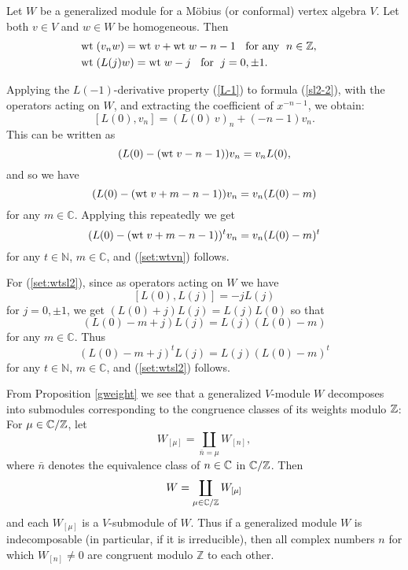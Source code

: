 \documentclass[12pt]{article}
\begin{document}
\begin{propo}\label{gweight}
Let $W$ be a generalized module for a M\"obius (or conformal) vertex
algebra $V$. Let both $v\in V$ and $w\in W$ be homogeneous. Then
\begin{eqnarray}
&\mbox{\rm wt}\;(v_n w)=\mbox{\rm wt}\; v +\mbox{\rm wt}\; w-n-1 \;\; \mbox{ for any }\; n\in {\mathbb Z},
&\label{set:wtvn}\\
&\mbox{\rm wt}\;(L(j)w)=\mbox{\rm wt}\; w-j \;\;\mbox{ for }\; j=0,\pm 1.&\label{set:wtsl2}
\end{eqnarray}
\end{propo}
\pf Applying the $L(-1)$-derivative property (\ref{L-1}) to formula
(\ref{sl2-2}), with the operators acting on $W$, and extracting the
coefficient of $x^{-n-1}$, we obtain:
\begin{equation}\label{[L(0),v_n]}
[L(0), v_n]=(L(0)\,v)_n+(-n-1)v_n.
\end{equation}
This can be written as
\[
(L(0)-(\mbox{\rm wt}\; v-n-1))v_n=v_n L(0),
\]
and so we have
\[
(L(0)-(\mbox{\rm wt}\; v+m-n-1))v_n=v_n (L(0)-m)
\]
for any $m\in {\mathbb C}$. Applying this repeatedly we get
\[
(L(0)-(\mbox{\rm wt}\; v+m-n-1))^t v_n=v_n (L(0)-m)^t
\]
for any $t\in {\mathbb N}$, $m\in {\mathbb C}$, and (\ref{set:wtvn})
follows.

For (\ref{set:wtsl2}), since as operators acting on $W$ we have
\begin{equation}\label{set:0j}
[L(0),L(j)]=-jL(j)
\end{equation}
for $j=0,\pm 1$, we get $(L(0)+j)L(j)=L(j)L(0)$ so that
\[
(L(0)-m+j)L(j)=L(j)(L(0)-m)
\]
for any $m\in {\mathbb C}$. Thus
\[
(L(0)-m+j)^tL(j)=L(j)(L(0)-m)^t
\]
for any $t\in {\mathbb N}$, $m\in {\mathbb C}$, and (\ref{set:wtsl2})
follows. \epf

\begin{rema}\label{congruent}{\rm
{}From Proposition \ref{gweight} we see that a generalized $V$-module
$W$ decomposes into submodules corresponding to the congruence classes
of its weights modulo $\mathbb{Z}$: For $\mu \in \mathbb{C}/\mathbb{Z}$, let
\begin{equation}
W_{[\mu]} = \coprod_{\bar n = \mu} W_{[n]},
\end{equation}
where $\bar n$ denotes the equivalence class of $n \in \mathbb{C}$ in
$\mathbb{C}/\mathbb{Z}$.  Then
\begin{equation}
W = \coprod_{\mu \in \mathbb{C}/\mathbb{Z}} W_{[\mu]}
\end{equation}
and each $W_{[\mu]}$ is a $V$-submodule of $W$.  Thus if a generalized
module $W$ is indecomposable (in particular, if it is irreducible),
then all complex numbers $n$ for which $W_{[n]}\neq 0$ are congruent
modulo ${\mathbb Z}$ to each other. }
\end{rema}
\end{document}
